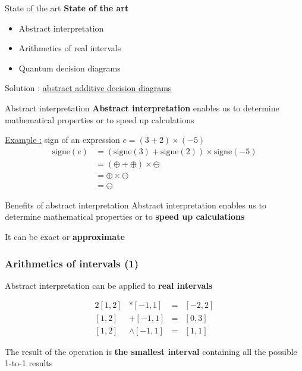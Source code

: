 \begin{frame}{State of the art}
    \textbf{State of the art}
    \begin{itemize}
        \item Abstract interpretation
        \item Arithmetics of real intervals
        \item Quantum decision diagrams
    \end{itemize}
    \pause
    \begin{center}
        Solution : \underline{abstract additive decision diagrams}
    \end{center}
\end{frame}

\begin{frame}{Abstract interpretation}
    \textbf{Abstract interpretation} enables us to determine mathematical properties or to speed up calculations

    \vspace{1em}
    \underline{Example :} sign of an expression $e = (3 + 2) \times (-5)$
    \begin{align*}
        \text{signe}(e) &= (\text{signe}(3) + \text{signe}(2)) \times \text{signe}(-5) \\
        &= (\oplus + \oplus) \times \ominus \\
        &= \oplus \times \ominus \\
        &= \ominus
    \end{align*}
\end{frame}

\begin{frame}{Benefits of abstract interpretation}
    Abstract interpretation enables us to determine mathematical properties or to \textbf{speed up calculations}

    \vspace{1em}

    It can be exact or \textbf{approximate}
\end{frame}

\begin{frame}
    \frametitle{Arithmetics of intervals (1)}

    Abstract interpretation can be applied to \textbf{real intervals}

    \begin{alignat*}{2}
    [1, 2] &* [-1, 1] &=& [-2, 2] \\
    [1, 2] &+ [-1, 1] &=& [0, 3] \\
    [1, 2] &\land [-1, 1] &=& [1, 1]
    \end{alignat*}

    \small{The result of the operation is \textbf{the smallest interval} containing all the possible 1-to-1 results}
\end{frame}

